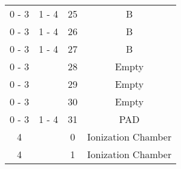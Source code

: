 \begin{tabular}{cccc}
0 - 3  &  1 - 4   &  25     &  B                    \\
0 - 3  &  1 - 4   &  26     &  B                    \\
0 - 3  &  1 - 4   &  27     &  B                    \\
0 - 3  &          &  28     &  Empty                \\
0 - 3  &          &  29     &  Empty                \\
0 - 3  &          &  30     &  Empty                \\
0 - 3  &  1 - 4   &  31     &  PAD                  \\
  4    &          &  0      &  Ionization Chamber   \\
  4    &          &  1      &  Ionization Chamber   \\
\hline
\end{tabular}
